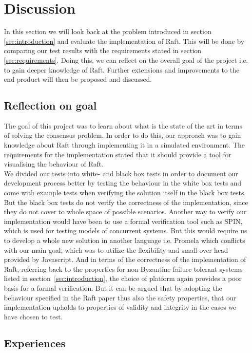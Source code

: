 \section{Discussion} %
\label{sec:discussion}
In this section we will look back at the problem introduced in section \ref{sec:introduction} and evaluate the implementation of Raft. This will be done by comparing our test results with the requirements stated in section \ref{sec:requirements}. Doing this, we can reflect on the overall goal of the project i.e. to gain deeper knowledge of Raft. Further extensions and improvements to the end product will then be proposed and discussed.

\subsection{Reflection on goal}
The goal of this project was to learn about what is the state of the art in terms of solving the consensus problem. In order to do this, our approach was to gain knowledge about Raft through implementing it in a simulated environment.
The requirements for the implementation stated that it should provide a tool for visualising the behaviour of Raft. \\
We divided our tests into white- and black box tests in order to document our development process better by testing the behaviour in the white box tests and come with example tests when verifying the solution itself in the black box tests. But the black box tests do not verify the correctness of the implementation, since they do not cover to whole space of possible scenarios. Another way to verify our implementation would have been to use a formal verification tool such as SPIN, which is used for testing models of concurrent systems. But this would require us to develop a whole new solution in another language i.e. Promela which conflicts with our main goal, which was to utilize the flexibility and small over head provided by Javascript. And in terms of the correctness of the implementation of Raft, referring back to the properties for non-Byzantine failure tolerant systems listed in section~\ref{sec:introduction}, the choice of platform again provides a poor basis for a formal verification. But it can be argued that by adopting the behaviour specified in the Raft paper thus also the safety properties, that our implementation upholds to properties of validity and integrity in the cases we have chosen to test.

\subsection{Experiences}

